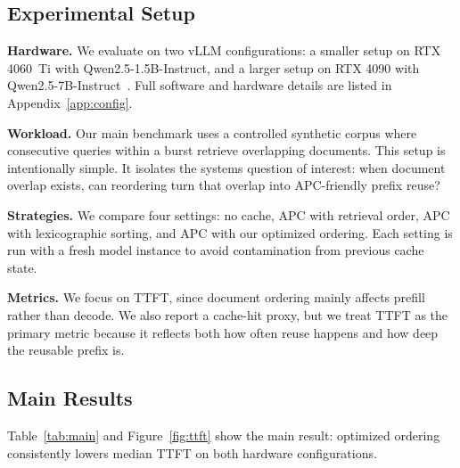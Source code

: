 \documentclass{article}
\begin{document}
\subsection{Experimental Setup}

\textbf{Hardware.} We evaluate on two vLLM configurations: a smaller setup on RTX 4060~Ti with Qwen2.5-1.5B-Instruct, and a larger setup on RTX 4090 with Qwen2.5-7B-Instruct~\citep{qwen25tr}. Full software and hardware details are listed in Appendix~\ref{app:config}.

\textbf{Workload.} Our main benchmark uses a controlled synthetic corpus where consecutive queries within a burst retrieve overlapping documents. This setup is intentionally simple. It isolates the systems question of interest: when document overlap exists, can reordering turn that overlap into APC-friendly prefix reuse?

\textbf{Strategies.} We compare four settings: no cache, APC with retrieval order, APC with lexicographic sorting, and APC with our optimized ordering. Each setting is run with a fresh model instance to avoid contamination from previous cache state.

\textbf{Metrics.} We focus on TTFT, since document ordering mainly affects prefill rather than decode. We also report a cache-hit proxy, but we treat TTFT as the primary metric because it reflects both how often reuse happens and how deep the reusable prefix is.


\subsection{Main Results}

Table~\ref{tab:main} and Figure~\ref{fig:ttft} show the main result: optimized ordering consistently lowers median TTFT on both hardware configurations.
\end{document}

